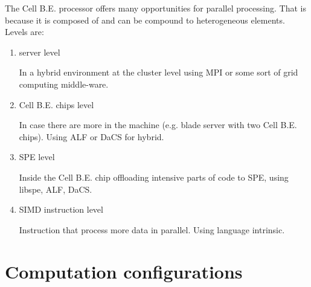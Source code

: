 The Cell B.E. processor offers many opportunities for parallel processing.
That is because it is composed of and can be compound to heterogeneous elements.
 Levels are:
\begin{enumerate}
\item server level
\par
In a hybrid environment at the cluster level using MPI or some sort of grid computing middle-ware.

\item Cell B.E. chips level
\par
In case there are more in the machine (e.g. blade server with two Cell B.E. chips). Using ALF or DaCS for hybrid.

\item SPE level
\par
Inside the Cell B.E. chip offloading intensive parts of code to SPE, using libspe, ALF, DaCS.

\item SIMD instruction level
\par
Instruction that process more data in parallel. Using language intrinsic.
\end{enumerate}

\section{Computation configurations}

